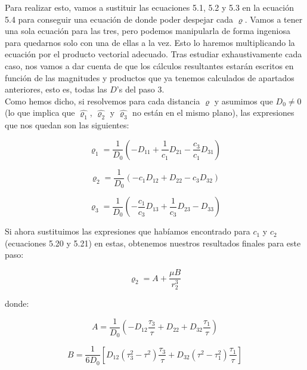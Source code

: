\documentclass{article}
\numberwithin{equation}{section}
\begin{document}
Para realizar esto, vamos a sustituir las ecuaciones 5.1, 5.2 y 5.3 en la ecuación 5.4 para conseguir una ecuación de donde poder despejar cada $\varrho$. Vamos a tener una sola ecuación para las tres, pero podemos manipularla de forma ingeniosa para quedarnos solo con una de ellas a la vez. Esto lo haremos multiplicando la ecuación por el producto vectorial adecuado. Tras estudiar exhaustivamente cada caso, nos vamos a dar cuenta de que los cálculos resultantes estarán escritos en función de las magnitudes y productos que ya tenemos calculados de apartados anteriores, esto es, todas las $D$'s del paso 3.\\

Como hemos dicho, si resolvemos para cada distancia $\varrho$ y asumimos que $D_0\neq0$ (lo que implica que $\hat{\varrho_1}$, $\hat{\varrho_2}$ y $\hat{\varrho_3}$ no están en el mismo plano), las expresiones que nos quedan son las siguientes:

\begin{equation}
\varrho_1 = \frac{1}{D_0} \left( -D_{11} + \frac{1}{c_1} D_{21} - \frac{c_3}{c_1} D_{31} \right)
\end{equation}

\begin{equation}
\varrho_2 = \frac{1}{D_0} (-c_1 D_{12} + D_{22} - c_3 D_{32})
\end{equation}

\begin{equation}
\varrho_3 = \frac{1}{D_0} \left( -\frac{c_1}{c_3} D_{13} + \frac{1}{c_3} D_{23} - D_{33} \right)
\end{equation}

Si ahora sustituimos las expresiones que habíamos encontrado para $c_1$ y $c_2$ (ecuaciones 5.20 y 5.21) en estas, obtenemos nuestros resultados finales para este paso:

\begin{equation}
    \varrho_2 = A + \frac{\mu B}{r_2^3}
\end{equation}

donde:

\begin{equation}
A = \frac{1}{D_0} \left( -D_{12} \frac{\tau_3}{\tau} + D_{22} + D_{32} \frac{\tau_1}{\tau} \right)
\end{equation}

\begin{equation}
B = \frac{1}{6D_0} \left[ D_{12} (\tau_3^2 - \tau^2) \frac{\tau_3}{\tau} + D_{32} (\tau^2 - \tau_1^2) \frac{\tau_1}{\tau} \right]
\end{equation}
\end{document}
